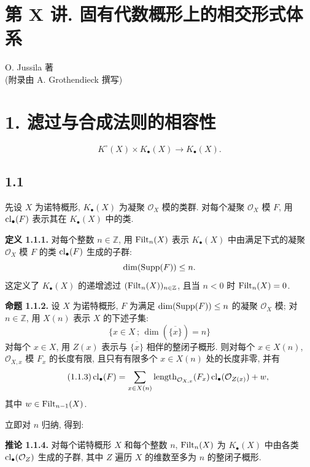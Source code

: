 
\section*{第 X 讲. 固有代数概形上的相交形式体系}
\begin{center}
O. Jussila 著\\ (附录由 A. Grothendieck 撰写)
%
\end{center}

\section*{1. 滤过与合成法则的相容性}
\[
K^\circ(X)\times K_\bullet(X)\longrightarrow K_\bullet(X).
\]

\subsection*{1.1}
先设 $X$ 为诺特概形, $K_\bullet(X)$ 为凝聚 $\mathcal O_X$ 模的类群. 对每个凝聚 $\mathcal O_X$ 模 $F$, 用 $\operatorname{cl}_\bullet(F)$ 表示其在 $K_\bullet(X)$ 中的类.
%
%
%

\textbf{定义 1.1.1.} 对每个整数 $n\in\mathbb Z$, 用 $\operatorname{Filt}_n(X)$ 表示 $K_\bullet(X)$ 中由满足下式的凝聚 $\mathcal O_X$ 模 $F$ 的类 $\operatorname{cl}_\bullet(F)$ 生成的子群:
%
%
%
\[
\dim(\operatorname{Supp}(F))\leq n.
\]
这定义了 $K_\bullet(X)$ 的递增滤过 $(\operatorname{Filt}_n(X))_{n\in\mathbb Z}$, 且当 $n<0$ 时 $\operatorname{Filt}_n(X)=0$.
%

\textbf{命题 1.1.2.} 设 $X$ 为诺特概形, $F$ 为满足 $\dim(\operatorname{Supp}(F))\leq n$ 的凝聚 $\mathcal O_X$ 模; 对 $n\in\mathbb Z$, 用 $X(n)$ 表示 $X$ 的下述子集:
%
%
%
\[
\{x\in X\,;\,\dim(\overline{\{x\}})=n\}
\]
对每个 $x\in X$, 用 $Z(x)$ 表示与 $\overline{\{x\}}$ 相伴的整闭子概形. 则对每个 $x\in X(n)$, $\mathcal O_{X,x}$ 模 $F_x$ 的长度有限, 且只有有限多个 $x\in X(n)$ 处的长度非零, 并有
%
%
%
\begin{equation}\tag{1.1.3}
\operatorname{cl}_\bullet(F)=
\sum_{x\in X(n)}\operatorname{length}_{\mathcal O_{X,x}}(F_x)\operatorname{cl}_\bullet(\mathcal O_{Z(x)})+w,
\end{equation}
其中 $w\in\operatorname{Filt}_{n-1}(X)$.

立即对 $n$ 归纳, 得到:

\textbf{推论 1.1.4.} 对每个诺特概形 $X$ 和每个整数 $n$, $\operatorname{Filt}_n(X)$ 为 $K_\bullet(X)$ 中由各类 $\operatorname{cl}_\bullet(\mathcal O_Z)$ 生成的子群, 其中 $Z$ 遍历 $X$ 的维数至多为 $n$ 的整闭子概形.
%
%
%
%

